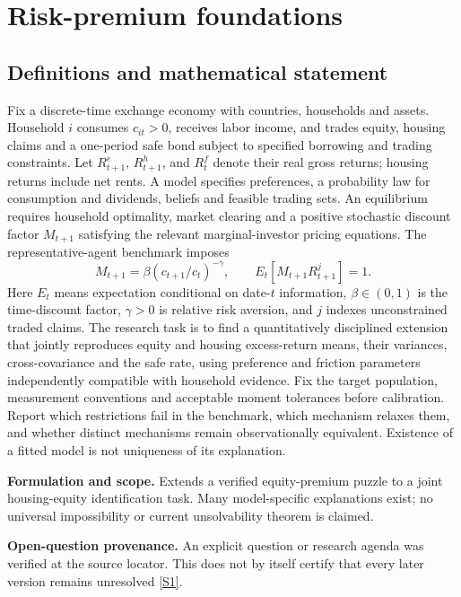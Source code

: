 \documentclass[11pt]{article}
\newcommand{\sref}[2]{\hyperlink{source:#1:#2}{[S#2]}}
\begin{document}
\section*{Risk-premium foundations}\label{30007592}
\subsection{Definitions and mathematical statement}
Fix a discrete-time exchange economy with countries, households and assets. Household \(i\) consumes \(c_{it}>0\), receives labor income, and trades equity, housing claims and a one-period safe bond subject to specified borrowing and trading constraints. Let \(R^e_{t+1}\), \(R^h_{t+1}\), and \(R^f_t\) denote their real gross returns; housing returns include net rents. A model specifies preferences, a probability law for consumption and dividends, beliefs and feasible trading sets. An equilibrium requires household optimality, market clearing and a positive stochastic discount factor \(M_{t+1}\) satisfying the relevant marginal-investor pricing equations. The representative-agent benchmark imposes
\[M_{t+1}=\beta(c_{t+1}/c_t)^{-\gamma},\qquad E_t[M_{t+1}R^j_{t+1}]=1.\]
Here \(E_t\) means expectation conditional on date-\(t\) information, \(\beta\in(0,1)\) is the time-discount factor, \(\gamma>0\) is relative risk aversion, and \(j\) indexes unconstrained traded claims. The research task is to find a quantitatively disciplined extension that jointly reproduces equity and housing excess-return means, their variances, cross-covariance and the safe rate, using preference and friction parameters independently compatible with household evidence. Fix the target population, measurement conventions and acceptable moment tolerances before calibration. Report which restrictions fail in the benchmark, which mechanism relaxes them, and whether distinct mechanisms remain observationally equivalent. Existence of a fitted model is not uniqueness of its explanation.

\par\textbf{Formulation and scope.} Extends a verified equity-premium puzzle to a joint housing-equity identification task. Many model-specific explanations exist; no universal impossibility or current unsolvability theorem is claimed.

\par\textbf{Open-question provenance.} An explicit question or research agenda was verified at the source locator. This does not by itself certify that every later version remains unresolved \sref{30007592}{1}.
\end{document}

